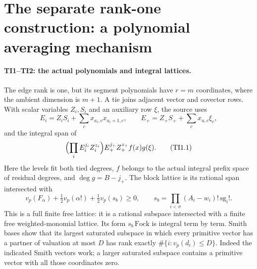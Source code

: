 \section{The separate rank-one construction: a polynomial averaging mechanism}
\label{sec:type-one}


\paragraph{TI1--TI2: the actual polynomials and integral lattices.}
The edge rank is one, but its segment polynomials have $r=m$ coordinates,
where the ambient dimension is $m+1$.  A tie joins adjacent vector and
covector rows.  With scalar variables $Z_i,S_i$ and an auxiliary row $\xi$,
the source uses
\[
 E_i=Z_iS_i+\sum_c x_{a_i,c}x_{a_i+1,c},\qquad
 E_+=Z_+S_++\sum_c x_{u,c}\xi_c,
\]
and the integral span of
\[
 \Bigl(\prod_iE_i^{j_i}Z_i^{z_i}\Bigr)E_+^{j_+}Z_+^{z_+}f(x)g(\xi).
 \tag{TI1.1}
\]
Here the levels fit both tied degrees, $f$ belongs to the actual integral
prefix space of residual degrees, and $\deg g=B-j_+$.
The block lattice is its rational span intersected with
\[
 v_p(F_\alpha)+\tfrac12v_p(\alpha!)+\tfrac12v_p(s_b)\geq0,
 \qquad s_b=\prod_{i<\sigma}(A_i-w_i)!\,\mathrm{sg}_i!.
 \tag{TI1.2}
\]
This is a full finite free lattice: it is a rational subspace intersected
with a finite free weighted-monomial lattice.  Its form $s_b\,\mathrm{Fock}$
is integral term by term.  Smith bases show that its largest saturated
subspace in which every primitive vector has a partner of valuation at
most $D$ has rank exactly $\#\{i:v_p(d_i)\leq D\}$.
Indeed the indicated Smith vectors work; a larger saturated subspace
contains a primitive vector with all those coordinates zero.

